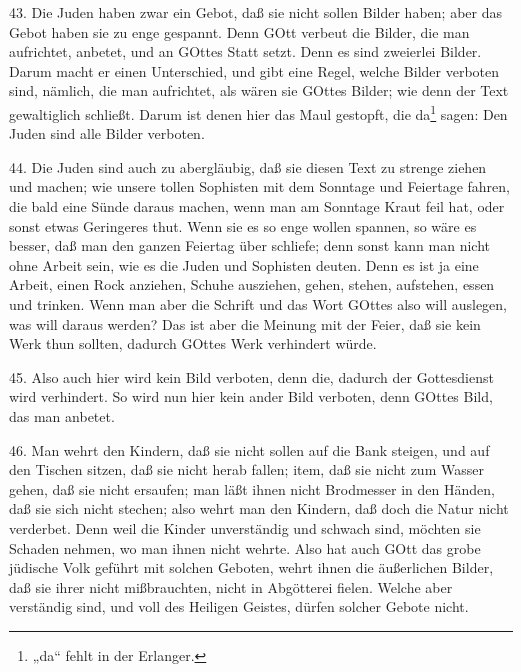 43. Die Juden haben zwar ein Gebot, daß sie nicht sollen Bilder haben; aber das Gebot haben sie zu enge gespannt. Denn GOtt verbeut die Bilder, die man aufrichtet, anbetet, und an GOttes Statt setzt. Denn es sind zweierlei Bilder. Darum macht er einen Unterschied, und gibt eine Regel, welche Bilder verboten sind, nämlich, die man aufrichtet, als wären sie GOttes Bilder; wie denn der Text gewaltiglich schließt. Darum ist denen hier das Maul gestopft, die da\footnote{„da“ fehlt in der Erlanger.} sagen: Den Juden sind alle Bilder verboten.

44. Die Juden sind auch zu abergläubig, daß sie diesen Text zu strenge ziehen und machen; wie unsere tollen Sophisten mit dem Sonntage und Feiertage fahren, die bald eine Sünde daraus machen, wenn man am Sonntage Kraut feil hat, oder sonst etwas Geringeres thut. Wenn sie es so enge wollen spannen, so wäre es besser, daß man den ganzen Feiertag über schliefe; denn sonst kann man nicht ohne Arbeit sein, wie es die Juden und Sophisten deuten. Denn es ist ja eine Arbeit, einen Rock anziehen, Schuhe ausziehen, gehen, stehen, aufstehen, essen und trinken. Wenn man aber die Schrift und das Wort GOttes also will auslegen, was will daraus werden? Das ist aber die Meinung
mit der Feier, daß sie kein Werk thun sollten, dadurch GOttes Werk verhindert würde.

45. Also auch hier wird kein Bild verboten, denn die, dadurch der Gottesdienst wird verhindert. So wird nun hier kein ander Bild verboten, denn GOttes Bild, das man anbetet.

46. Man wehrt den Kindern, daß sie nicht sollen auf die Bank steigen, und auf den Tischen sitzen, daß sie nicht herab fallen; item, daß sie nicht zum Wasser gehen, daß sie nicht ersaufen; man läßt ihnen nicht Brodmesser in den Händen, daß sie sich nicht stechen; also wehrt man den Kindern, daß doch die Natur nicht verderbet. Denn weil die Kinder unverständig und schwach sind, möchten sie Schaden nehmen, wo man ihnen nicht wehrte. Also hat auch GOtt das grobe jüdische Volk geführt mit solchen Geboten, wehrt ihnen die äußerlichen Bilder, daß sie ihrer nicht mißbrauchten, nicht in Abgötterei fielen. Welche aber verständig sind, und voll des Heiligen Geistes, dürfen solcher Gebote nicht.

